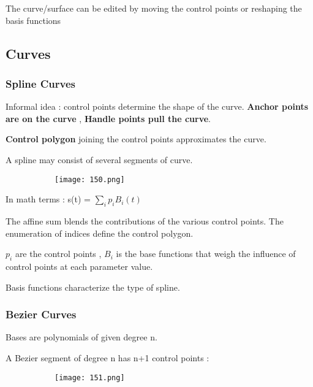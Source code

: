 \documentclass{article}
\begin{document}
The curve/surface can be edited by moving the control points or reshaping the basis functions

\vspace{100mm}

\subsection{Curves}

\subsubsection{Spline Curves}

Informal idea : control points determine the shape of the curve. \textbf{Anchor points are on the curve} , \textbf{Handle points pull the curve}.

\textbf{Control polygon} joining the control points approximates the curve.

A spline may consist of several segments of curve.

    \begin{figure}[ht!]
  \centering
  \begin{subfigure}[b]{0.5\linewidth}
    \texttt{[image: 150.png]}
  \end{subfigure}
\end{figure}

In math terms : s(t) = $\sum_i p_i B_i (t)$

The affine sum blends the contributions of the various control points. The enumeration of indices define the control polygon.

$p_i$ are the control points , $B_i$ is the base functions that weigh the influence of control points at each parameter value.

Basis functions characterize the type of spline.

\subsubsection{Bezier Curves}

Bases are polynomials of given degree n.

A Bezier segment of degree n has n+1 control points :

    \begin{figure}[ht!]
  \centering
  \begin{subfigure}[b]{0.6\linewidth}
    \texttt{[image: 151.png]}
  \end{subfigure}
\end{figure}
\end{document}
